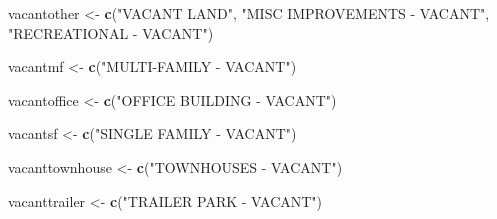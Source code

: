 \documentclass[]{article}
\newenvironment{Shaded}{\begin{snugshade}}{\end{snugshade}}
\newcommand{\KeywordTok}[1]{\textcolor[rgb]{0.13,0.29,0.53}{\textbf{#1}}}
\newcommand{\StringTok}[1]{\textcolor[rgb]{0.31,0.60,0.02}{#1}}
\newcommand{\NormalTok}[1]{#1}
\begin{document}
\begin{Shaded}
\begin{Highlighting}[]
\NormalTok{vacantother <-}\StringTok{ }\KeywordTok{c}\NormalTok{(}\StringTok{"VACANT LAND"}\NormalTok{,}
                 \StringTok{"MISC IMPROVEMENTS - VACANT"}\NormalTok{,}
                 \StringTok{"RECREATIONAL - VACANT"}\NormalTok{)}

\NormalTok{vacantmf <-}\StringTok{ }\KeywordTok{c}\NormalTok{(}\StringTok{"MULTI-FAMILY - VACANT"}\NormalTok{)}

\NormalTok{vacantoffice <-}\StringTok{ }\KeywordTok{c}\NormalTok{(}\StringTok{"OFFICE BUILDING - VACANT"}\NormalTok{)}

\NormalTok{vacantsf <-}\StringTok{ }\KeywordTok{c}\NormalTok{(}\StringTok{"SINGLE FAMILY - VACANT"}\NormalTok{)}

\NormalTok{vacanttownhouse <-}\StringTok{ }\KeywordTok{c}\NormalTok{(}\StringTok{"TOWNHOUSES - VACANT"}\NormalTok{)}

\NormalTok{vacanttrailer <-}\StringTok{ }\KeywordTok{c}\NormalTok{(}\StringTok{"TRAILER PARK - VACANT"}\NormalTok{)}


\end{Highlighting}
\end{Shaded}
\end{document}
